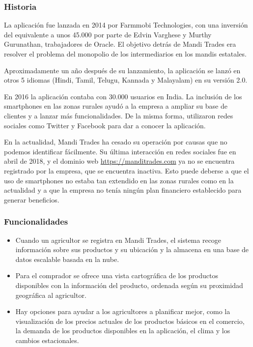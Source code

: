\subsubsection{Historia}

La aplicación fue lanzada en 2014 por Farmmobi Technologies, con una inversión del equivalente a unos 45.000\geneuro{}  por parte de Edvin Varghese y Murthy Gurunathan, trabajadores de Oracle. El objetivo detrás de Mandi Trades era resolver el problema del monopolio de los intermediarios en los mandis estatales.

Aproximadamente un año después de su lanzamiento, la aplicación se lanzó en otros 5 idiomas (Hindi, Tamil, Telugu, Kannada y Malayalam) en su versión 2.0.

En 2016 la aplicación contaba con 30.000 usuarios en India. La inclusión de los smartphones en las zonas rurales ayudó a la empresa a ampliar su base de clientes y a lanzar más funcionalidades. De la misma forma, utilizaron redes sociales como Twitter y Facebook para dar a conocer la aplicación.

En la actualidad, Mandi Trades ha cesado su operación por causas que no podemos identificar fácilmente. Su última interacción en redes sociales fue en abril de 2018, y el dominio web \url{https://manditrades.com} ya no se encuentra registrado por la empresa, que se encuentra inactiva. Esto puede deberse a que el uso de smartphones no estaba tan extendido en las zonas rurales como en la actualidad y a que la empresa no tenía ningún plan financiero establecido para generar beneficios.

\subsubsection{Funcionalidades}

\begin{itemize}

	\item Cuando un agricultor se registra en Mandi Trades, el sistema recoge información sobre sus productos y su ubicación y la almacena en una base de datos escalable basada en la nube.
	
	\item Para el comprador se ofrece una vista cartográfica de los productos disponibles con la información del producto, ordenada según su proximidad geográfica al agricultor.

	\item Hay opciones para ayudar a los agricultores a planificar mejor, como la visualización de los precios actuales de los productos básicos en el comercio, la demanda de los productos disponibles en la aplicación, el clima y los cambios estacionales.

\end{itemize}


